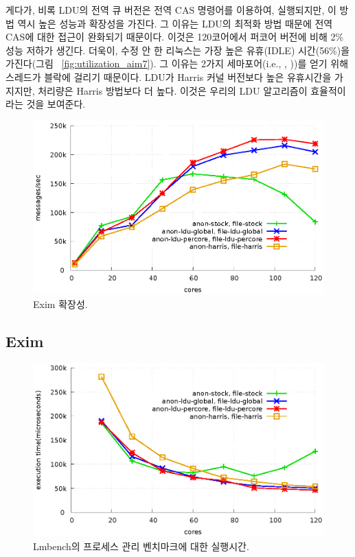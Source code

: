 게다가, 비록 LDU의 전역 큐 버전은 전역 CAS 명령어를 이용하여, 실행되지만, 이 
방법 역시 높은 성능과 확장성을 가진다.
그 이유는 LDU의 최적화 방법 때문에 전역 CAS에 대한 접근이 완화되기 때문이다.
이것은 120코어에서 퍼코어 버전에 비해 2\% 성능 저하가 생긴다. 
더욱이, 수정 안 한 리눅스는 가장 높은 유휴(IDLE) 시간(56\%)을 가진다(그림 ~\ref{fig:utilization_aim7}). 
그 이유는 2가지 세마포어(i.e.,
, ))를 얻기 위해 스레드가 블락에
걸리기 때문이다.
LDU가 Harris 커널 버전보다 높은 유휴시간을 가지지만, 처리량은 Harris 방법보다 더 높다.
이것은 우리의 LDU 알고리즘이 효율적이라는 것을 보여준다. 

\begin{figure}[tb]
  \begin{center}
    \includegraphics[scale=1]{graph/exim.eps}
  \end{center}
  \caption{Exim 확장성.}
  \label{fig:exim}
\end{figure}

\subsection{Exim}

\begin{figure}[tb]
  \begin{center}
    \includegraphics[scale=1]{graph/lmbench.eps}
  \end{center}
  \caption{Lmbench의 프로세스 관리 벤치마크에 대한 실행시간.}
  \label{fig:MicroBench}
\end{figure}

